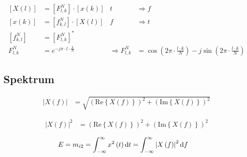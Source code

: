 \begin{boxleft}
\end{boxleft}\begin{boxrightshaded}
\begin{align*}
\left[X\left(l\right)\right]&=\left[F_{l,k}^N\right]\cdot\left[x\left(k\right)\right]&t&\Rightarrow f\\
\left[x\left(k\right)\right]&=\left[f_{k,l}^N\right]\cdot\left[X\left(l\right)\right]&f&\Rightarrow t\\
\left[f_{k,l}^N\right]&=\left[F_{l,k}^N\right]^*\\
F_{l,k}^N&=e^{-j\pi \cdot l\cdot \frac{k}{N}}&\Rightarrow F_{l,k}^N&=\cos\left(2\pi\cdot \frac{l\cdot k}{N}\right)-j\sin\left(2\pi\cdot \frac{l\cdot k}{N}\right)
\end{align*}
\end{boxrightshaded}


\subsection{Spektrum}

\begin{boxleft}
\end{boxleft}\begin{boxrightshaded}
\begin{align*}
\left|X\left(f\right)\right|&=\sqrt{\left(\text{Re}\left\{X\left(f\right)\right\}\right)^2+\left(\text{Im}\left\{X\left(f\right)\right\}\right)^2}
\end{align*}
\end{boxrightshaded}

\begin{boxleft}
\end{boxleft}\begin{boxrightshaded}
\begin{align*}
\left|X\left(f\right)\right|^2&=\left(\text{Re}\left\{X\left(f\right)\right\}\right)^2+\left(\text{Im}\left\{X\left(f\right)\right\}\right)^2
\end{align*}
\end{boxrightshaded}

\begin{boxleft}
\end{boxleft}\begin{boxrightshaded}
\begin{align*}
E&=m_{i2}=\int_{-\infty}^\infty x^2\left(t\right)\mathop{}\!\mathrm{d} t=\int_{-\infty}^\infty \left|X\left(f\right)\right|^2\mathop{}\!\mathrm{d} f
\end{align*}
\end{boxrightshaded}

